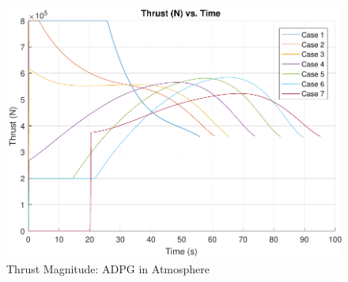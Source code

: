 \begin{figure}[H]
	\centering
	\begin{minipage}{4.5 in}
		\includegraphics[width=\linewidth]{Figures/thrpowatmo.pdf}
		\caption{Thrust Magnitude: ADPG in Atmosphere \label{fig:thrpowatmo} }
	\end{minipage}
\end{figure}




